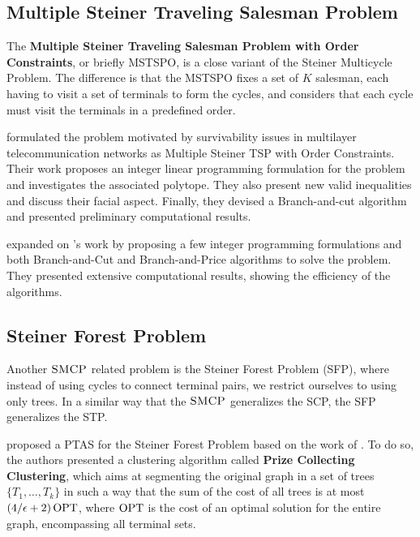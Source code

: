 \subsection{Multiple Steiner Traveling Salesman Problem}

The \textbf{Multiple Steiner Traveling Salesman Problem with Order Constraints}, or briefly MSTSPO, is a close variant of the Steiner Multicycle Problem. The difference is that the MSTSPO fixes a set of \(K\) salesman, each having to visit a set of terminals to form the cycles, and considers that each cycle must visit the terminals in a predefined order.

\cite{BORNE2013487} formulated the problem motivated by survivability issues in multilayer telecommunication networks as Multiple Steiner TSP with Order Constraints. Their work proposes an integer linear programming formulation for the problem and investigates the associated polytope. They also present new valid inequalities and discuss their facial aspect. Finally, they devised a Branch-and-cut algorithm and presented preliminary computational results.

\cite{Gabrel2020} expanded on \citeauthor{BORNE2013487}'s work by proposing a few integer programming formulations and both Branch-and-Cut and Branch-and-Price algorithms to solve the problem. They presented extensive computational results, showing the efficiency of the algorithms.

\subsection{Steiner Forest Problem}

Another \(\textsc{SMCP}\) related problem is the Steiner Forest Problem (SFP), where instead of using cycles to connect terminal pairs, we restrict ourselves to using only trees. In a similar way that the \(\textsc{SMCP}\) generalizes the SCP, the SFP generalizes the STP. 

\cite{Bateni} proposed a PTAS for the Steiner Forest Problem based on the work of \cite{Borradaile2009b}. To do so, the authors presented a clustering algorithm called \textbf{Prize Collecting Clustering}, which aims at segmenting the original graph in a set of trees \(\{T_1, \dots, T_k\}\) in such a way that the sum of the cost of all trees is at most \((4/\epsilon + 2) \operatorname{\textrm{OPT}}\), where \(\operatorname{\textrm{OPT}}\) is the cost of an optimal solution for the entire graph, encompassing all terminal sets.

